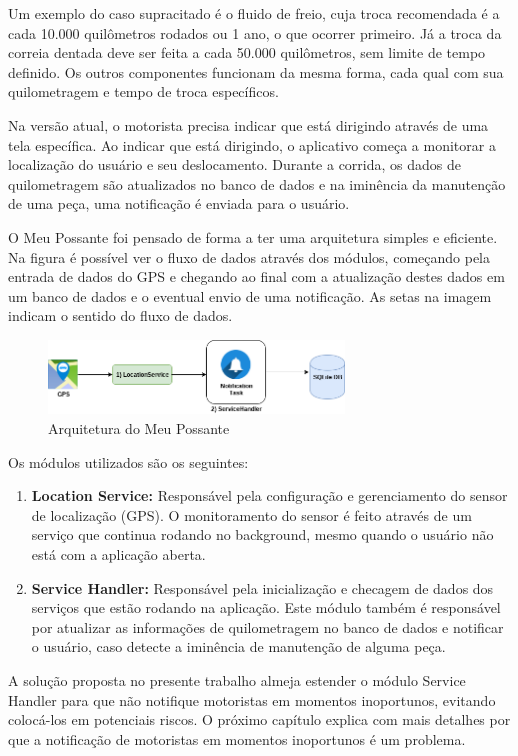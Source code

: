 Um exemplo do caso supracitado é o fluido de freio, cuja troca recomendada é a cada
10.000 quilômetros rodados ou 1 ano, o que ocorrer primeiro. Já a troca da correia
dentada deve ser feita a cada 50.000 quilômetros, sem limite de tempo definido. Os
outros componentes funcionam da mesma forma, cada qual com sua quilometragem e
tempo de troca específicos.

Na versão atual, o motorista precisa indicar que está dirigindo através de uma tela
específica. Ao indicar que está dirigindo, o aplicativo começa a monitorar a localização
do usuário e seu deslocamento. Durante a corrida, os dados de quilometragem são atualizados
no banco de dados e na iminência da manutenção de uma peça, uma notificação é enviada para o
usuário.

O Meu Possante foi pensado de forma a ter uma arquitetura simples e eficiente. Na figura
é possível ver o fluxo de dados através dos módulos, começando pela entrada de dados do GPS
e chegando ao final com a atualização destes dados em um banco de dados e o eventual envio de
uma notificação. As setas na imagem indicam o sentido do fluxo de dados.

\begin{figure}[h]
  \centering
  \includegraphics[width=0.7\textwidth]{images/arquitetura-meu-possante.png}
  \caption{Arquitetura do Meu Possante}
  \label{meu-possante-arquitetura}
\end{figure}

Os módulos utilizados são os seguintes:

\begin{enumerate}
  \item \textbf{Location Service:} Responsável pela configuração e gerenciamento do sensor de localização (GPS).
    O monitoramento do sensor é feito através de um serviço que continua rodando no background,
    mesmo quando o usuário não está com a aplicação aberta.
  \item \textbf{Service Handler:} Responsável pela inicialização e checagem de dados dos serviços
    que estão rodando na aplicação. Este módulo também é responsável por atualizar as informações
    de quilometragem no banco de dados e notificar o usuário, caso detecte a iminência de
    manutenção de alguma peça.
\end{enumerate}

A solução proposta no presente trabalho almeja estender o módulo Service Handler para que não notifique motoristas
em momentos inoportunos, evitando colocá-los em potenciais riscos. O próximo capítulo explica com mais detalhes
por que a notificação de motoristas em momentos inoportunos é um problema.
